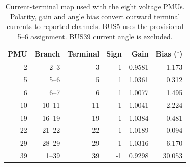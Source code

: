 \begin{table}[t]\centering\small
\caption{Current-terminal map used with the eight voltage PMUs.
Polarity, gain and angle bias convert outward terminal currents to
reported channels. BUS5 uses the provisional 5--6 assignment.
BUS39 current angle is excluded.}
\label{tab:main-terminal-map}
\begin{tabular}{@{}rrrrrr@{}}\toprule
PMU & Branch & Terminal & Sign & Gain & Bias ($^\circ$)\\\midrule
2 & 2--3 & 3 & 1 & 0.9581 & -1.173 \\
5 & 5--6 & 5 & 1 & 1.0361 & 0.312 \\
6 & 6--7 & 6 & 1 & 1.0077 & 1.495 \\
10 & 10--11 & 11 & -1 & 1.0041 & 2.224 \\
19 & 16--19 & 19 & 1 & 1.0384 & 0.481 \\
22 & 21--22 & 22 & 1 & 1.0189 & 0.094 \\
29 & 28--29 & 29 & -1 & 1.0316 & -6.170 \\
39 & 1--39 & 39 & -1 & 0.9298 & 30.053 \\
\bottomrule\end{tabular}
\end{table}
